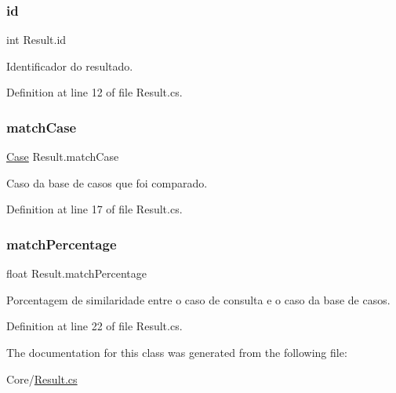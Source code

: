 \subsubsection{\texorpdfstring{id}{id}}
{\footnotesize\ttfamily int Result.\+id}



Identificador do resultado. 



Definition at line 12 of file Result.\+cs.

\hypertarget{class_result_a715e03ca8c315d38e8e6842f3e6f710e}{}\label{class_result_a715e03ca8c315d38e8e6842f3e6f710e} 
\subsubsection{\texorpdfstring{match\+Case}{matchCase}}
{\footnotesize\ttfamily \hyperlink{class_case}{Case} Result.\+match\+Case}



Caso da base de casos que foi comparado. 



Definition at line 17 of file Result.\+cs.

\hypertarget{class_result_a591657b84ecc4e2b0c2f50e824a5c45a}{}\label{class_result_a591657b84ecc4e2b0c2f50e824a5c45a} 
\subsubsection{\texorpdfstring{match\+Percentage}{matchPercentage}}
{\footnotesize\ttfamily float Result.\+match\+Percentage}



Porcentagem de similaridade entre o caso de consulta e o caso da base de casos. 



Definition at line 22 of file Result.\+cs.



The documentation for this class was generated from the following file\+:\begin{DoxyCompactItemize}
\item 
Core/\hyperlink{_result_8cs}{Result.\+cs}\end{DoxyCompactItemize}
